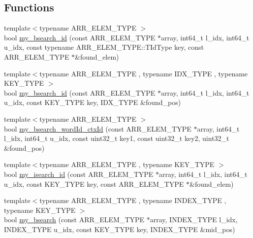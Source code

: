 \subsection*{Functions}
\begin{DoxyCompactItemize}
\item 
{\footnotesize template$<$typename A\+R\+R\+\_\+\+E\+L\+E\+M\+\_\+\+T\+Y\+P\+E $>$ }\\bool \hyperlink{namespaceuva_1_1utils_1_1containers_1_1utils_a72ccbd06b023cd715ed69cc75ee8054f}{my\+\_\+bsearch\+\_\+id} (const A\+R\+R\+\_\+\+E\+L\+E\+M\+\_\+\+T\+Y\+P\+E $\ast$array, int64\+\_\+t l\+\_\+idx, int64\+\_\+t u\+\_\+idx, const typename A\+R\+R\+\_\+\+E\+L\+E\+M\+\_\+\+T\+Y\+P\+E\+::\+T\+Id\+Type key, const A\+R\+R\+\_\+\+E\+L\+E\+M\+\_\+\+T\+Y\+P\+E $\ast$\&found\+\_\+elem)
\item 
{\footnotesize template$<$typename A\+R\+R\+\_\+\+E\+L\+E\+M\+\_\+\+T\+Y\+P\+E , typename I\+D\+X\+\_\+\+T\+Y\+P\+E , typename K\+E\+Y\+\_\+\+T\+Y\+P\+E $>$ }\\bool \hyperlink{namespaceuva_1_1utils_1_1containers_1_1utils_a9b58dc54173e94211d0e5e3acd69702e}{my\+\_\+bsearch\+\_\+id} (const A\+R\+R\+\_\+\+E\+L\+E\+M\+\_\+\+T\+Y\+P\+E $\ast$array, int64\+\_\+t l\+\_\+idx, int64\+\_\+t u\+\_\+idx, const K\+E\+Y\+\_\+\+T\+Y\+P\+E key, I\+D\+X\+\_\+\+T\+Y\+P\+E \&found\+\_\+pos)
\item 
{\footnotesize template$<$typename A\+R\+R\+\_\+\+E\+L\+E\+M\+\_\+\+T\+Y\+P\+E $>$ }\\bool \hyperlink{namespaceuva_1_1utils_1_1containers_1_1utils_af7ec60c27e50affde107ae926741b6d0}{my\+\_\+bsearch\+\_\+word\+Id\+\_\+ctx\+Id} (const A\+R\+R\+\_\+\+E\+L\+E\+M\+\_\+\+T\+Y\+P\+E $\ast$array, int64\+\_\+t l\+\_\+idx, int64\+\_\+t u\+\_\+idx, const uint32\+\_\+t key1, const uint32\+\_\+t key2, uint32\+\_\+t \&found\+\_\+pos)
\item 
{\footnotesize template$<$typename A\+R\+R\+\_\+\+E\+L\+E\+M\+\_\+\+T\+Y\+P\+E , typename K\+E\+Y\+\_\+\+T\+Y\+P\+E $>$ }\\bool \hyperlink{namespaceuva_1_1utils_1_1containers_1_1utils_aa90a9b943e18d3d2f1f6ac58c4df713c}{my\+\_\+isearch\+\_\+id} (const A\+R\+R\+\_\+\+E\+L\+E\+M\+\_\+\+T\+Y\+P\+E $\ast$array, int64\+\_\+t l\+\_\+idx, int64\+\_\+t u\+\_\+idx, const K\+E\+Y\+\_\+\+T\+Y\+P\+E key, const A\+R\+R\+\_\+\+E\+L\+E\+M\+\_\+\+T\+Y\+P\+E $\ast$\&found\+\_\+elem)
\item 
{\footnotesize template$<$typename A\+R\+R\+\_\+\+E\+L\+E\+M\+\_\+\+T\+Y\+P\+E , typename I\+N\+D\+E\+X\+\_\+\+T\+Y\+P\+E , typename K\+E\+Y\+\_\+\+T\+Y\+P\+E $>$ }\\bool \hyperlink{namespaceuva_1_1utils_1_1containers_1_1utils_a5d93685adf3007ae50d20899e49b9f30}{my\+\_\+bsearch} (const A\+R\+R\+\_\+\+E\+L\+E\+M\+\_\+\+T\+Y\+P\+E $\ast$array, I\+N\+D\+E\+X\+\_\+\+T\+Y\+P\+E l\+\_\+idx, I\+N\+D\+E\+X\+\_\+\+T\+Y\+P\+E u\+\_\+idx, const K\+E\+Y\+\_\+\+T\+Y\+P\+E key, I\+N\+D\+E\+X\+\_\+\+T\+Y\+P\+E \&mid\+\_\+pos)

\end{DoxyCompactItemize}
